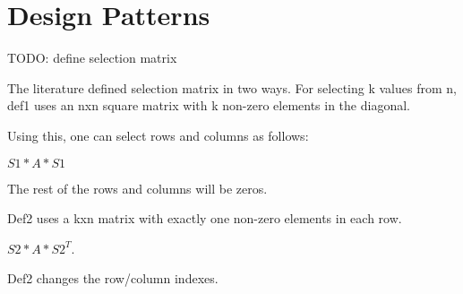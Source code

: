 \section{Design Patterns}

TODO: define selection matrix

The literature defined selection matrix in two ways. For selecting k values from n, def1 uses an nxn square matrix with k non-zero elements in the diagonal.

Using this, one can select rows and columns as follows:

$S1 * A * S1$

The rest of the rows and columns will be zeros.

Def2 uses a kxn matrix with exactly one non-zero elements in each row.

$S2 * A * S2^T$.

Def2 changes the row/column indexes.
